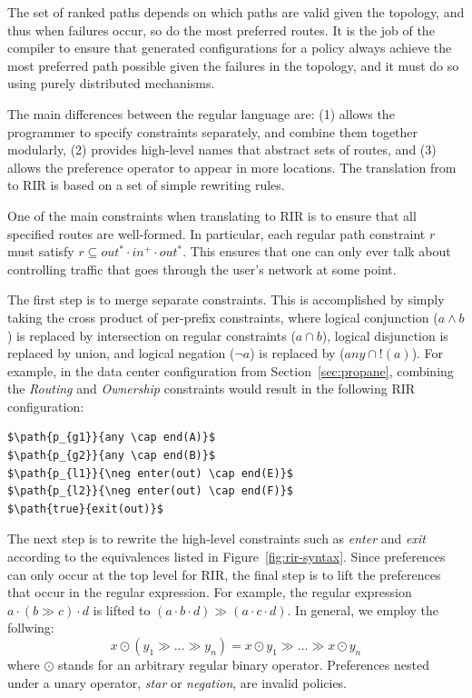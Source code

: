 The set of ranked paths depends on which paths are valid given the topology, and thus when failures occur, so do the most preferred routes. It is the job of the \sysname compiler to ensure that generated configurations for a policy always achieve the most preferred path possible given the failures in the topology, and it must do so using purely distributed mechanisms.



The main differences between \sysname the regular language are: (1) \sysname allows the programmer to specify constraints separately, and combine them together modularly, (2) \sysname provides high-level names that abstract sets of routes, and (3) \sysname allows the preference operator to appear in more locations.
The translation from \sysname to RIR is based on a set of simple rewriting rules.

One of the main constraints when translating to RIR is to ensure that all specified routes are well-formed. In particular, each regular path constraint $r$ must satisfy $r \subseteq out^* \cdot in^+ \cdot out^*$. This ensures that one can only ever talk about controlling traffic that goes through the user's network at some point.

The first step is to merge separate constraints. This is accomplished by simply taking the cross product of per-prefix constraints, where logical conjunction ($a \wedge b$) is replaced by intersection on regular constraints ($a \cap b$), logical disjunction is replaced by union, and logical negation ($\neg a$) is replaced by ($any \cap !(a)$).
%
For example, in the data center configuration from Section~\ref{sec:propane}, combining the \textit{Routing} and \textit{Ownership} constraints would result in the following RIR configuration:

\begin{lstlisting}[mathescape=true]
$\path{p_{g1}}{any \cap end(A)}$
$\path{p_{g2}}{any \cap end(B)}$
$\path{p_{l1}}{\neg enter(out) \cap end(E)}$
$\path{p_{l2}}{\neg enter(out) \cap end(F)}$
$\path{true}{exit(out)}$
\end{lstlisting}

The next step is to rewrite the high-level constraints such as \textit{enter} and \textit{exit} according to the equivalences listed in Figure~\ref{fig:rir-syntax}. Since preferences can only occur at the top level for RIR, the final step is to lift the preferences that occur in the regular expression. For example, the regular expression $a \cdot (b \gg c) \cdot d$ is lifted to $(a \cdot b \cdot d) \gg (a \cdot c \cdot d)$. In general, we employ the follwing:
%
$$x \odot (y_1 \gg \dots \gg y_n) = x \odot y_1 \gg \dots \gg x \odot y_n$$
%
where $\odot$ stands for an arbitrary regular binary operator. Preferences nested under a unary operator, \textit{star} or \textit{negation}, are invalid policies.






